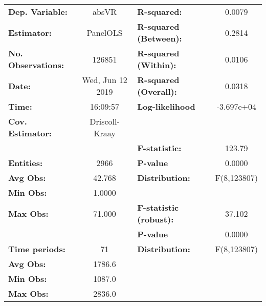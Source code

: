\begin{center}
\begin{tabular}{lclc}
\toprule
\textbf{Dep. Variable:}                 &       absVR        & \textbf{  R-squared:         }   &      0.0079      \\
\textbf{Estimator:}                     &      PanelOLS      & \textbf{  R-squared (Between):}  &      0.2814      \\
\textbf{No. Observations:}              &       126851       & \textbf{  R-squared (Within):}   &      0.0106      \\
\textbf{Date:}                          &  Wed, Jun 12 2019  & \textbf{  R-squared (Overall):}  &      0.0318      \\
\textbf{Time:}                          &      16:09:57      & \textbf{  Log-likelihood     }   &    -3.697e+04    \\
\textbf{Cov. Estimator:}                &   Driscoll-Kraay   & \textbf{                     }   &                  \\
\textbf{}                               &                    & \textbf{  F-statistic:       }   &      123.79      \\
\textbf{Entities:}                      &        2966        & \textbf{  P-value            }   &      0.0000      \\
\textbf{Avg Obs:}                       &       42.768       & \textbf{  Distribution:      }   &   F(8,123807)    \\
\textbf{Min Obs:}                       &       1.0000       & \textbf{                     }   &                  \\
\textbf{Max Obs:}                       &       71.000       & \textbf{  F-statistic (robust):} &      37.102      \\
\textbf{}                               &                    & \textbf{  P-value            }   &      0.0000      \\
\textbf{Time periods:}                  &         71         & \textbf{  Distribution:      }   &   F(8,123807)    \\
\textbf{Avg Obs:}                       &       1786.6       & \textbf{                     }   &                  \\
\textbf{Min Obs:}                       &       1087.0       & \textbf{                     }   &                  \\
\textbf{Max Obs:}                       &       2836.0       & \textbf{                     }   &                  \\

\end{tabular}
\end{center}
